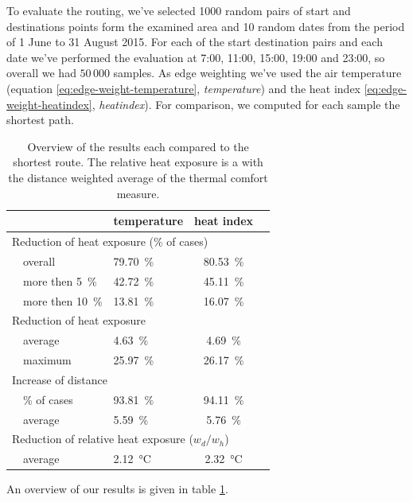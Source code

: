 To evaluate the routing, we've selected 1000 random pairs of start and destinations points form the examined  area and 10 random dates from the period of 1 June to 31 August 2015. For each of the start destination pairs and each date we've performed the evaluation at 7:00, 11:00, 15:00, 19:00 and 23:00, so overall we had $50\,000$ samples. As edge weighting we've used the air temperature (equation \eqref{eq:edge-weight-temperature}, \emph{temperature})  and the heat index \eqref{eq:edge-weight-heatindex}, \emph{heatindex}). For comparison, we computed for each sample the shortest path. 

\begin{table}
	\centering
	\begin{tabular}{lp{8cm}lcc}
		\hline
		 & & temperature & heat index \\
		 \hline
		 \multicolumn{4}{l}{Reduction of heat exposure (\% of cases) }   \\
		& overall  & \SI{79.70}{\percent} & \SI{80.53}{\percent}  \\
		& more then \SI{5}{\percent} & \SI{42.72}{\percent} & \SI{45.11}{\percent} \\
		& more then \SI{10}{\percent} & \SI{13.81}{\percent} & \SI{16.07}{\percent} \\
		 \multicolumn{4}{l}{Reduction of heat exposure}  \\
		& average  & \SI{4.63}{\percent} & \SI{4.69}{\percent}  \\
		& maximum  & \SI{25.97}{\percent} & \SI{26.17 }{\percent}  \\
		\multicolumn{4}{l}{Increase of distance}  \\
		& \% of cases & \SI{93.81}{\percent} & \SI{94.11}{\percent}  \\
		& average & \SI{5.59}{\percent} & \SI{5.76}{\percent}  \\
		 \multicolumn{4}{l}{Reduction of relative heat exposure ($w_d / w_h$)}  \\
		 & average  & \SI{2.12}{\celsius} & \SI{2.32}{\celsius}  \\
		 \hline
	\end{tabular}
	\caption{Overview of the results each compared to the shortest route. The relative heat exposure is a with the distance weighted average of the thermal comfort measure. \label{tab:results-routing}}
\end{table}

An overview of our results is given in table \ref{tab:results-routing}.

